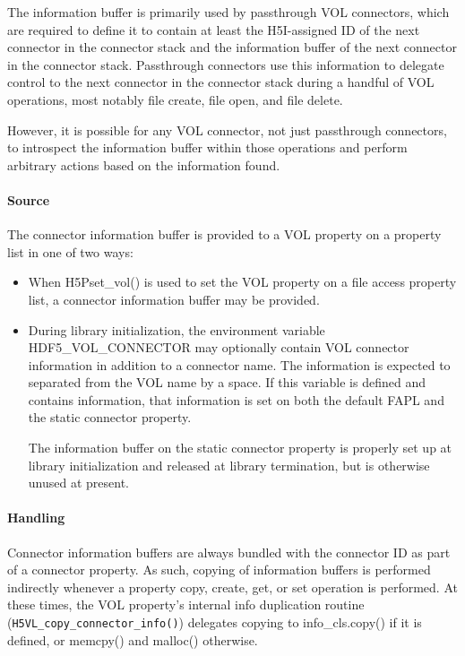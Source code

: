 \documentclass{article}
\begin{document}
The information buffer is primarily used by passthrough VOL connectors, which are required to define it to contain at least the H5I-assigned ID of the next connector in the connector stack and the information buffer of the next connector in the connector stack. Passthrough connectors use this information to delegate control to the next connector in the connector stack during a handful of VOL operations, most notably file create, file open, and file delete.

However, it is possible for any VOL connector, not just passthrough connectors, to introspect the information buffer within those operations and perform arbitrary actions based on the information found. 

\paragraph{Source}

The connector information buffer is provided to a VOL property on a property list in one of two ways:

\begin{itemize}
    \item When H5Pset\_vol() is used to set the VOL property on a file access property list, a connector information buffer may be provided.
    
    \item During library initialization, the environment variable HDF5\_VOL\_CONNECTOR may optionally contain VOL connector information in addition to a connector name. The information is expected to separated from the VOL name by a space. If this variable is defined and contains information, that information is set on both the default FAPL and the static connector property.
    
    The information buffer on the static connector property is properly set up at library initialization and released at library termination, but is otherwise unused at present.
\end{itemize}

\paragraph{Handling}

Connector information buffers are always bundled with the connector ID as part of a connector property. As such, copying of information buffers is performed indirectly whenever a property copy, create, get, or set operation is performed. At these times, the VOL property's internal info duplication routine (\texttt{H5VL\_copy\_connector\_info()})  delegates copying to info\_cls.copy() if it is defined, or memcpy() and malloc() otherwise.
\end{document}
